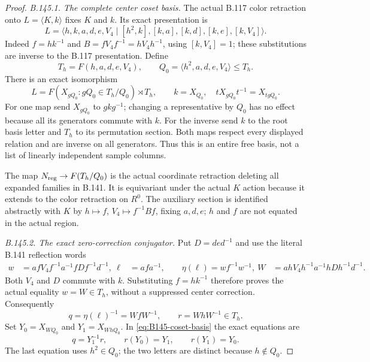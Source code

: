 \begin{proof}
\emph{B.145.1. The complete center coset basis.}
The actual B.117 color retraction onto $L=\langle K,k\rangle$
fixes $K$ and $k$. Its exact presentation is
\begin{equation}\label{eq:B145-L}
 L=\langle h,k,a,d,e,V_4\mid
 [h^2,k],[k,a],[k,d],[k,e],[k,V_4]\rangle.
\end{equation}
Indeed $f=hk^{-1}$ and
$B=fV_4f^{-1}=hV_4h^{-1}$, using $[k,V_4]=1$; these substitutions
are inverse to the B.117 presentation. Define
\[
 T_h=F(h,a,d,e,V_4),\qquad Q_0=\langle h^2,a,d,e,V_4\rangle\leq T_h.
\]
There is an exact isomorphism
\begin{equation}\label{eq:B145-coset-basis}
 L=F(X_{gQ_0}:gQ_0\in T_h/Q_0)\rtimes T_h,
 \qquad k=X_{Q_0},\quad tX_{gQ_0}t^{-1}=X_{tgQ_0}.
\end{equation}
For one map send $X_{gQ_0}$ to $gkg^{-1}$; changing a representative
by $Q_0$ has no effect because all its generators commute with $k$.
For the inverse send $k$ to the root basis letter and $T_h$ to its
permutation section. Both maps respect every displayed relation
and are inverse on all generators. Thus this is an entire free
basis, not a list of linearly independent sample columns.

The map $N_{\rm reg}\to F(T_h/Q_0)$ is the actual coordinate
retraction deleting all expanded families in B.141. It is equivariant
under the actual $K$ action because it extends to the color
retraction on $R^0$. The auxiliary section is identified abstractly
with $K$ by $h\mapsto f$, $V_4\mapsto f^{-1}Bf$, fixing $a,d,e$;
$h$ and $f$ are not equated in the actual region.

\emph{B.145.2. The exact zero-correction conjugator.}
Put $D=ded^{-1}$ and use the literal B.141 reflection words
\begin{equation}\label{eq:B145-W}
\begin{split}
 w&=afV_4f^{-1}a^{-1}fDf^{-1}d^{-1},\
 \ell&=afa^{-1},\qquad \eta(\ell)=wf^{-1}w^{-1},\
 W&=ahV_4h^{-1}a^{-1}hDh^{-1}d^{-1}.
\end{split}
\end{equation}
Both $V_4$ and $D$ commute with $k$. Substituting $f=hk^{-1}$
therefore proves the actual equality $w=W\in T_h$, without a
suppressed center correction. Consequently
\[
 q=\eta(\ell)^{-1}=WfW^{-1},\qquad r=WhW^{-1}\in T_h.
\]
Set $Y_0=X_{WQ_0}$ and $Y_1=X_{WhQ_0}$. In
\eqref{eq:B145-coset-basis} the exact equations are
\begin{equation}\label{eq:B145-q}
 q=Y_1^{-1}r,\qquad r(Y_0)=Y_1,\qquad r(Y_1)=Y_0.
\end{equation}
The last equation uses $h^2\in Q_0$; the two letters are distinct
because $h\notin Q_0$.


\end{proof}
